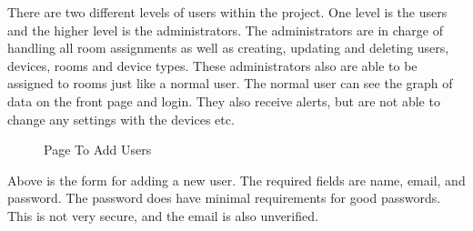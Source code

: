 \documentclass{report}
\begin{document}
\indent
There are two different levels of users within the project. One level is the users and the higher level is the administrators.
\newline
\indent
The administrators are in charge of handling all room assignments as well as creating, updating and deleting users, devices, rooms and device types. These administrators also are able to be assigned to rooms just like a normal user.
\newline
\indent
The normal user can see the graph of data on the front page and login. They also receive alerts, but are not able to change any settings with the devices etc.
\begin{figure}[H]
	\caption{Page To Add Users}
\end{figure}
\indent
Above is the form for adding a new user. The required fields are name, email, and password. The password does have minimal requirements for good passwords. This is not very secure, and the email is also unverified.
\newpage
\end{document}
